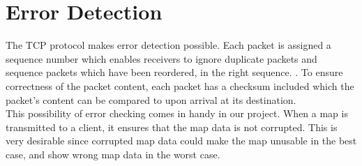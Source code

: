 \section{Error Detection}
The TCP protocol makes error detection possible. Each packet is assigned a sequence number which enables receivers to ignore duplicate packets and sequence packets which have been reordered, in the right sequence. . To ensure correctness of the packet content, each packet has a checksum included which the packet's content can be compared to upon arrival at its destination.\\

This possibility of error checking comes in handy in our project. When a map is transmitted to a client, it ensures that the map data is not corrupted. This is very desirable since corrupted map data could make the map unusable in the best case, and show wrong map data in the worst case.